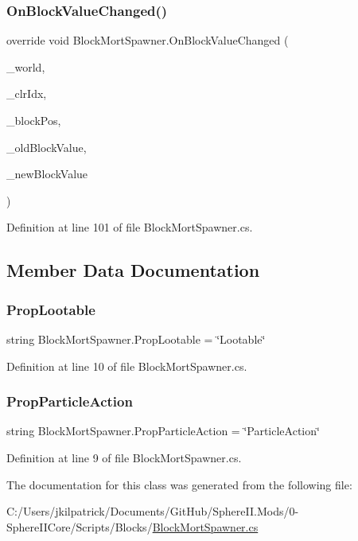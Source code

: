 \subsubsection{\texorpdfstring{OnBlockValueChanged()}{OnBlockValueChanged()}}
{\footnotesize\ttfamily override void Block\+Mort\+Spawner.\+On\+Block\+Value\+Changed (\begin{DoxyParamCaption}\item[{World\+Base}]{\+\_\+world,  }\item[{int}]{\+\_\+clr\+Idx,  }\item[{Vector3i}]{\+\_\+block\+Pos,  }\item[{Block\+Value}]{\+\_\+old\+Block\+Value,  }\item[{Block\+Value}]{\+\_\+new\+Block\+Value }\end{DoxyParamCaption})}



Definition at line 101 of file Block\+Mort\+Spawner.\+cs.



\subsection{Member Data Documentation}
\mbox{\label{class_block_mort_spawner_adba21057d41a5dac48c6872392ab49fa}} 
\subsubsection{\texorpdfstring{PropLootable}{PropLootable}}
{\footnotesize\ttfamily string Block\+Mort\+Spawner.\+Prop\+Lootable = \char`\"{}Lootable\char`\"{}}



Definition at line 10 of file Block\+Mort\+Spawner.\+cs.

\mbox{\label{class_block_mort_spawner_afe9da3fe4eb77b95f88943323d8eb08e}} 
\subsubsection{\texorpdfstring{PropParticleAction}{PropParticleAction}}
{\footnotesize\ttfamily string Block\+Mort\+Spawner.\+Prop\+Particle\+Action = \char`\"{}Particle\+Action\char`\"{}}



Definition at line 9 of file Block\+Mort\+Spawner.\+cs.



The documentation for this class was generated from the following file\+:\begin{DoxyCompactItemize}
\item 
C\+:/\+Users/jkilpatrick/\+Documents/\+Git\+Hub/\+Sphere\+I\+I.\+Mods/0-\/\+Sphere\+I\+I\+Core/\+Scripts/\+Blocks/\mbox{\hyperlink{_block_mort_spawner_8cs}{Block\+Mort\+Spawner.\+cs}}\end{DoxyCompactItemize}
